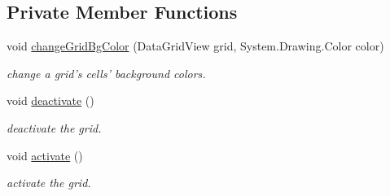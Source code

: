 \subsection*{Private Member Functions}
\begin{DoxyCompactItemize}
\item 
void \hyperlink{class_ias_pbx_config_1_1_name_value_grid_af0f5a477e7dc8c4903278ca045fdc56f}{changeGridBgColor} (DataGridView grid, System.Drawing.Color color)
\begin{DoxyCompactList}\small\item\em change a grid's cells' background colors. \item\end{DoxyCompactList}\item 
void \hyperlink{class_ias_pbx_config_1_1_name_value_grid_a6754dd22f44f6aad8ef8b104e92d2538}{deactivate} ()
\begin{DoxyCompactList}\small\item\em deactivate the grid. \item\end{DoxyCompactList}\item 
void \hyperlink{class_ias_pbx_config_1_1_name_value_grid_a26d39bc7c64da504edfe7243f311ff22}{activate} ()
\begin{DoxyCompactList}\small\item\em activate the grid. \item\end{DoxyCompactList}\end{DoxyCompactItemize}
